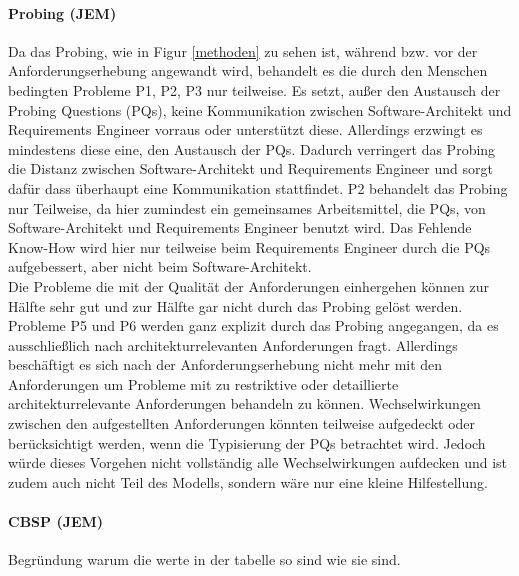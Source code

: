 \paragraph{Probing (JEM)}
Da das Probing, wie in Figur \ref{methoden} zu sehen ist, während bzw. vor der Anforderungserhebung angewandt wird, behandelt es die durch den Menschen bedingten Probleme P1, P2, P3 nur teilweise. Es setzt, außer den Austausch der Probing Questions (PQs), keine Kommunikation zwischen Software-Architekt und Requirements Engineer vorraus oder unterstützt diese. Allerdings erzwingt es mindestens diese eine, den Austausch der PQs. Dadurch verringert das Probing die Distanz zwischen Software-Architekt und Requirements Engineer und  sorgt dafür dass überhaupt eine Kommunikation stattfindet. P2 behandelt das Probing nur Teilweise, da hier zumindest ein gemeinsames Arbeitsmittel, die PQs, von Software-Architekt und Requirements Engineer benutzt wird. Das Fehlende Know-How wird hier nur teilweise beim Requirements Engineer durch die PQs aufgebessert, aber nicht beim Software-Architekt. \\
Die Probleme die mit der Qualit\"at der Anforderungen einhergehen können zur Hälfte sehr gut und zur Hälfte gar nicht durch das Probing gelöst werden. Probleme P5 und P6 werden ganz explizit durch das Probing angegangen, da es ausschließlich nach architekturrelevanten Anforderungen fragt. Allerdings beschäftigt es sich nach der Anforderungserhebung nicht mehr mit den Anforderungen um Probleme mit zu restriktive oder detaillierte architekturrelevante Anforderungen behandeln zu können. Wechselwirkungen zwischen den aufgestellten Anforderungen könnten teilweise aufgedeckt oder berücksichtigt werden, wenn die Typisierung der PQs betrachtet wird. Jedoch würde dieses Vorgehen nicht vollständig alle Wechselwirkungen aufdecken und ist zudem auch nicht Teil des Modells, sondern wäre nur eine kleine Hilfestellung. \\

\paragraph{CBSP (JEM)}
Begründung warum die werte in der tabelle so sind wie sie sind. \\



%
